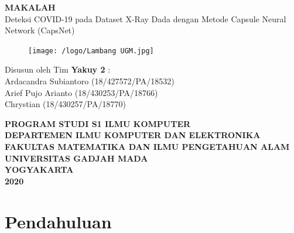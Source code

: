 \documentclass{article}
\begin{document}
  \begin{titlepage}
    \begin{center}
      
      \null
      {
      \huge \bfseries MAKALAH}\\
      [1cm]
      {\LARGE Deteksi COVID-19 pada Dataset X-Ray Dada dengan Metode Capsule Neural Network (CapsNet)}\\
          
      \vspace{2cm}

      \begin{figure}[H]
        \centering
        \texttt{[image: /logo/Lambang UGM.jpg]}
      \end{figure}
          
      \vspace{3cm}
    
      {\Large 
      Disusun oleh Tim \bfseries Yakuy 2} {\Large :\\
      \vspace{0.5cm}
      Ardacandra Subiantoro (18/427572/PA/18532)\\
      Arief Pujo Arianto (18/430253/PA/18766)\\
      Chrystian (18/430257/PA/18770)\\
      }


      \vspace{2cm}

      {\normalsize \bfseries
      PROGRAM STUDI S1 ILMU KOMPUTER\\
      DEPARTEMEN ILMU KOMPUTER DAN ELEKTRONIKA\\
      FAKULTAS MATEMATIKA DAN ILMU PENGETAHUAN ALAM\\
      UNIVERSITAS GADJAH MADA\\
      YOGYAKARTA\\
      \vspace{0.2cm}
      2020
      }
            
    \end{center}
  \end{titlepage}


  \newpage
  \tableofcontents
  \newpage
  \section{Pendahuluan}
\end{document}
